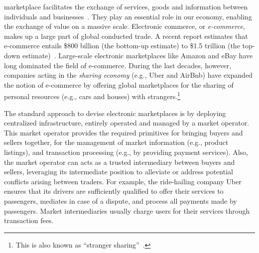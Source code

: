  marketplace facilitates the exchange of services, goods and information between individuals and businesses~\cite{bakos1998emerging}.
They play an essential role in our economy, enabling the exchange of value on a massive scale.
Electronic commerce, or \emph{e-commerce}, makes up a large part of global conducted trade.
A recent report estimates that e-commerce entails \$800 billion (the bottom-up estimate) to \$1.5 trillion (the top-down estimate)~\cite{ecommerceestimate}.
Large-scale electronic marketplaces like Amazon and eBay have long dominated the field of e-commerce.
During the last decades, however, companies acting in the \emph{sharing economy} (e.g., Uber and AirBnb) have expanded the notion of e-commerce by offering global marketplaces for the sharing of personal resources (e.g., cars and houses) with strangers.\footnote{This is also known as \enquote{stranger sharing}~\cite{schor2016debating}.}


The standard approach to devise electronic marketplaces is by deploying centralized infrastructure, entirely operated and managed by a market operator.
This market operator provides the required primitives for bringing buyers and sellers together, for the management of market information (e.g., product listings), and transaction processing (e.g., by providing payment services).
Also, the market operator can acts as a trusted intermediary between buyers and sellers, leveraging its intermediate position to alleviate or address potential conflicts arising between traders.
For example, the ride-hailing company Uber ensures that its drivers are sufficiently qualified to offer their services to passengers, mediates in case of a dispute, and process all payments made by passengers.
Market intermediaries usually charge users for their services through transaction fees.

